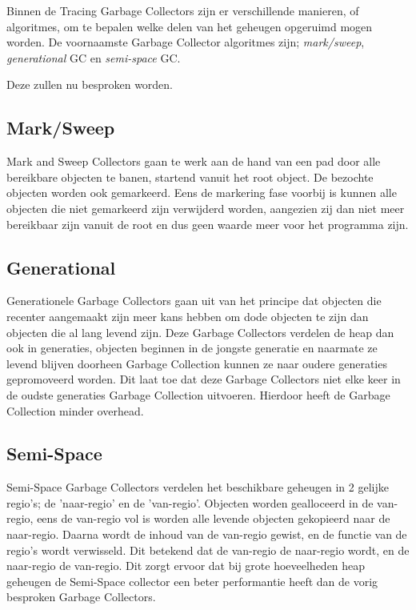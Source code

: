 Binnen de Tracing Garbage Collectors zijn er verschillende manieren, of algoritmes, om te bepalen welke delen van het geheugen opgeruimd mogen worden.
De voornaamste Garbage Collector algoritmes zijn; \textit{mark/sweep}, \textit{generational} GC en \textit{semi-space} GC.

Deze zullen nu besproken worden.
\subsection{Mark/Sweep}
Mark and Sweep Collectors gaan te werk aan de hand van een pad door alle bereikbare objecten te banen, startend vanuit het root object. De bezochte objecten worden ook gemarkeerd. Eens de markering fase voorbij is kunnen alle objecten die niet gemarkeerd zijn verwijderd worden, aangezien zij dan niet meer bereikbaar zijn vanuit de root en dus geen waarde meer voor het programma zijn.



\subsection{Generational}
\label{sec:generational}    
Generationele Garbage Collectors gaan uit van het principe dat objecten die recenter aangemaakt zijn meer kans hebben om dode objecten te zijn dan objecten die al lang levend zijn.
Deze Garbage Collectors verdelen de heap dan ook in generaties, objecten beginnen in de jongste generatie en naarmate ze levend blijven doorheen Garbage Collection kunnen ze naar oudere generaties gepromoveerd worden.
Dit laat toe dat deze Garbage Collectors niet elke keer in de oudste generaties Garbage Collection uitvoeren.   
 Hierdoor heeft de Garbage Collection minder overhead.




\subsection{Semi-Space}
\label{sec:semi-space}    
Semi-Space Garbage Collectors verdelen het beschikbare geheugen in 2 gelijke regio's; de 'naar-regio' en de 'van-regio'.
Objecten worden gealloceerd in de van-regio, eens de van-regio vol is worden alle levende objecten gekopieerd naar de naar-regio.
Daarna wordt de inhoud van de van-regio gewist, en de functie van de regio's wordt verwisseld.
Dit betekend dat de van-regio de naar-regio wordt, en de naar-regio de van-regio. \autocite{Byers2007}
Dit zorgt ervoor dat bij grote hoeveelheden heap geheugen de Semi-Space collector een beter performantie heeft dan de vorig besproken Garbage Collectors.



